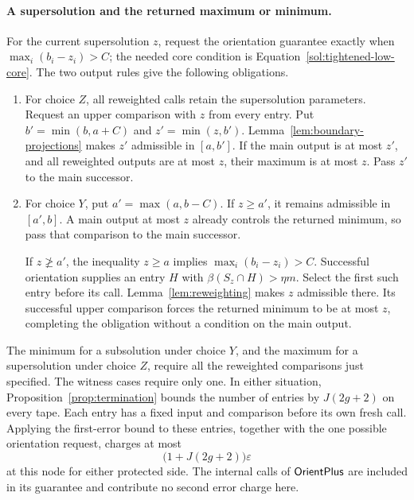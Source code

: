 \paragraph{A supersolution and the returned maximum or minimum.}
For the current supersolution \(z\), request the orientation
guarantee exactly when \(\max_i(b_i-z_i)>C\); the needed core
condition is Equation~\eqref{sol:tightened-low-core}.
The two output rules give the following obligations.

\begin{enumerate}[label=\textup{(\roman*)},leftmargin=*]
\item
For choice \(Z\), all reweighted calls retain the supersolution
parameters. Request an upper comparison with \(z\) from every
entry. Put \(b'=\min(b,a+C)\) and \(z'=\min(z,b')\).
Lemma~\ref{lem:boundary-projections} makes \(z'\) admissible in
\([a,b']\). If the main output is at most \(z'\), and all
reweighted outputs are at most \(z\), their maximum is at most
\(z\). Pass \(z'\) to the main successor.

\item
For choice \(Y\), put \(a'=\max(a,b-C)\). If \(z\ge a'\),
it remains admissible in \([a',b]\). A main output at most \(z\)
already controls the returned minimum, so pass that comparison to
the main successor.

If \(z\not\ge a'\), the inequality \(z\ge a\) implies
\(\max_i(b_i-z_i)>C\). Successful orientation supplies an entry
\(H\) with \(\beta(S_z\cap H)>\eta m\). Select the first such
entry before its call. Lemma~\ref{lem:reweighting} makes \(z\)
admissible there. Its successful upper comparison forces the
returned minimum to be at most \(z\), completing the obligation
without a condition on the main output.
\end{enumerate}

The minimum for a subsolution under choice \(Y\), and the maximum
for a supersolution under choice \(Z\), require all the reweighted
comparisons just specified. The witness cases require only one.
In either situation, Proposition~\ref{prop:termination} bounds the
number of entries by \(J(2g+2)\) on every tape. Each entry has a
fixed input and comparison before its own fresh call. Applying the
first-error bound to these entries, together with the one possible
orientation request, charges at most
\begin{equation}
 \bigl(1+J(2g+2)\bigr)\varepsilon
 \label{sol:post-tightening-error}
\end{equation}
at this node for either protected side. The internal calls of
\(\mathsf{OrientPlus}\) are included in its guarantee and contribute no
second error charge here.

